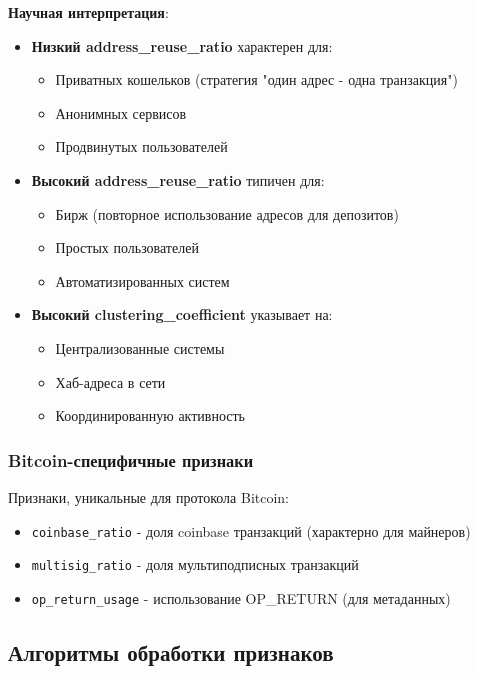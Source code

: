 \textbf{Научная интерпретация}:
\begin{itemize}
    \item \textbf{Низкий address\_reuse\_ratio} характерен для:
        \begin{itemize}
            \item Приватных кошельков (стратегия "один адрес - одна транзакция")
            \item Анонимных сервисов
            \item Продвинутых пользователей
        \end{itemize}
    \item \textbf{Высокий address\_reuse\_ratio} типичен для:
        \begin{itemize}
            \item Бирж (повторное использование адресов для депозитов)
            \item Простых пользователей
            \item Автоматизированных систем
        \end{itemize}
    \item \textbf{Высокий clustering\_coefficient} указывает на:
        \begin{itemize}
            \item Централизованные системы
            \item Хаб-адреса в сети
            \item Координированную активность
        \end{itemize}
\end{itemize}

\subsubsection{Bitcoin-специфичные признаки}

Признаки, уникальные для протокола Bitcoin:

\begin{itemize}
    \item \texttt{coinbase\_ratio} - доля coinbase транзакций (характерно для майнеров)
    \item \texttt{multisig\_ratio} - доля мультиподписных транзакций
    \item \texttt{op\_return\_usage} - использование OP\_RETURN (для метаданных)
\end{itemize}

\subsection{Алгоритмы обработки признаков}

